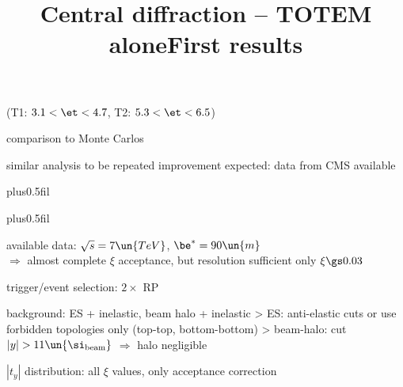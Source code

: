 \centerline{(T1: $3.1 < \et < 4.7$, T2: $5.3 < \et < 6.5$)}

\> comparison to Monte Carlos

\centerline{}


\vfil
\noindent{}

{
\> similar analysis to be repeated
\> improvement expected: data from CMS available
}


\newpage %
\hbox{}
\vfil
\title{Central diffraction -- TOTEM alone}

\vskip0pt plus0.5fil

\vskip0pt plus0.5fil


\newpage %
\title{First results}

\> available data: $\sqrt s = 7\un{TeV}$, $\be^* = 90\un{m}$\\
$\Rightarrow$ almost complete $\xi$ acceptance, but resolution sufficient only $\xi \gs 0.03$

\> trigger/event selection: $2\times$ RP

\> background: ES + inelastic, beam halo + inelastic
\>> ES: anti-elastic cuts or use forbidden topologies only (top-top, bottom-bottom)
\>> beam-halo: cut $|y| > 11\un{\si_{\rm beam}}$ $\Rightarrow$ halo negligible

\> $|t_y|$ distribution: all $\xi$ values, only acceptance correction





